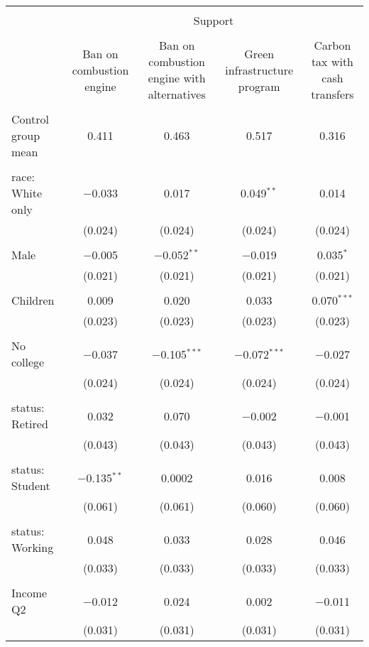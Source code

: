 
\begin{tabular}{@{\extracolsep{5pt}}lcccc} 
\\[-1.8ex]\hline 
\hline \\[-1.8ex] 
 & \multicolumn{4}{c}{Support} \\ 
\cline{2-5} 
\\[-1.8ex] & Ban on combustion engine & Ban on combustion engine with alternatives & Green infrastructure program & Carbon tax with cash transfers \\ 
\hline \\[-1.8ex] 
 Control group mean & 0.411 & 0.463 & 0.517 & 0.316  \\ \hline \\[-1.8ex] race: White only & $-$0.033 & 0.017 & 0.049$^{**}$ & 0.014 \\ 
  & (0.024) & (0.024) & (0.024) & (0.024) \\ 
  & & & & \\ 
 Male & $-$0.005 & $-$0.052$^{**}$ & $-$0.019 & 0.035$^{*}$ \\ 
  & (0.021) & (0.021) & (0.021) & (0.021) \\ 
  & & & & \\ 
 Children & 0.009 & 0.020 & 0.033 & 0.070$^{***}$ \\ 
  & (0.023) & (0.023) & (0.023) & (0.023) \\ 
  & & & & \\ 
 No college & $-$0.037 & $-$0.105$^{***}$ & $-$0.072$^{***}$ & $-$0.027 \\ 
  & (0.024) & (0.024) & (0.024) & (0.024) \\ 
  & & & & \\ 
 status: Retired & 0.032 & 0.070 & $-$0.002 & $-$0.001 \\ 
  & (0.043) & (0.043) & (0.043) & (0.043) \\ 
  & & & & \\ 
 status: Student & $-$0.135$^{**}$ & 0.0002 & 0.016 & 0.008 \\ 
  & (0.061) & (0.061) & (0.060) & (0.060) \\ 
  & & & & \\ 
 status: Working & 0.048 & 0.033 & 0.028 & 0.046 \\ 
  & (0.033) & (0.033) & (0.033) & (0.033) \\ 
  & & & & \\ 
 Income Q2 & $-$0.012 & 0.024 & 0.002 & $-$0.011 \\ 
  & (0.031) & (0.031) & (0.031) & (0.031) \\ 

\end{tabular}

